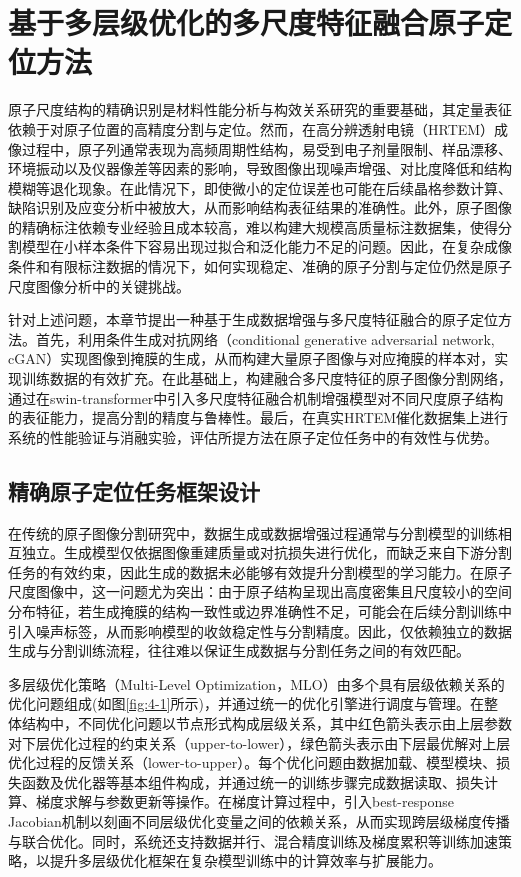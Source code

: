 \chapter{基于多层级优化的多尺度特征融合原子定位方法}

原子尺度结构的精确识别是材料性能分析与构效关系研究的重要基础，其定量表征依赖于对原子位置的高精度分割与定位。然而，在高分辨透射电镜（HRTEM）成像过程中，原子列通常表现为高频周期性结构，易受到电子剂量限制、样品漂移、环境振动以及仪器像差等因素的影响，导致图像出现噪声增强、对比度降低和结构模糊等退化现象。在此情况下，即使微小的定位误差也可能在后续晶格参数计算、缺陷识别及应变分析中被放大，从而影响结构表征结果的准确性。此外，原子图像的精确标注依赖专业经验且成本较高，难以构建大规模高质量标注数据集，使得分割模型在小样本条件下容易出现过拟合和泛化能力不足的问题。因此，在复杂成像条件和有限标注数据的情况下，如何实现稳定、准确的原子分割与定位仍然是原子尺度图像分析中的关键挑战。

针对上述问题，本章节提出一种基于生成数据增强与多尺度特征融合的原子定位方法。首先，利用条件生成对抗网络\cite{isola2017image}（conditional generative adversarial network, cGAN）实现图像到掩膜的生成，从而构建大量原子图像与对应掩膜的样本对，实现训练数据的有效扩充。在此基础上，构建融合多尺度特征的原子图像分割网络，通过在swin-transformer中引入多尺度特征融合机制增强模型对不同尺度原子结构的表征能力，提高分割的精度与鲁棒性。最后，在真实HRTEM催化数据集上进行系统的性能验证与消融实验，评估所提方法在原子定位任务中的有效性与优势。

\section{精确原子定位任务框架设计}
在传统的原子图像分割研究中，数据生成或数据增强过程通常与分割模型的训练相互独立。生成模型仅依据图像重建质量或对抗损失进行优化，而缺乏来自下游分割任务的有效约束，因此生成的数据未必能够有效提升分割模型的学习能力。在原子尺度图像中，这一问题尤为突出：由于原子结构呈现出高度密集且尺度较小的空间分布特征，若生成掩膜的结构一致性或边界准确性不足，可能会在后续分割训练中引入噪声标签，从而影响模型的收敛稳定性与分割精度。因此，仅依赖独立的数据生成与分割训练流程，往往难以保证生成数据与分割任务之间的有效匹配。

多层级优化策略（Multi-Level Optimization，MLO）\cite{choe2022betty}由多个具有层级依赖关系的优化问题组成(如图\ref{fig:4-1}所示)，并通过统一的优化引擎进行调度与管理。在整体结构中，不同优化问题以节点形式构成层级关系，其中红色箭头表示由上层参数对下层优化过程的约束关系（upper-to-lower），绿色箭头表示由下层最优解对上层优化过程的反馈关系（lower-to-upper）。每个优化问题由数据加载、模型模块、损失函数及优化器等基本组件构成，并通过统一的训练步骤完成数据读取、损失计算、梯度求解与参数更新等操作。在梯度计算过程中，引入best-response Jacobian机制以刻画不同层级优化变量之间的依赖关系，从而实现跨层级梯度传播与联合优化。同时，系统还支持数据并行、混合精度训练及梯度累积等训练加速策略，以提升多层级优化框架在复杂模型训练中的计算效率与扩展能力。


